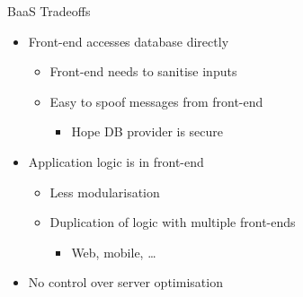 \documentclass{slide}
\begin{document}
\begin{frame}{BaaS Tradeoffs}
\vspace{1pt}
{\huge
\begin{itemize}
     \item<1-> Front-end accesses database directly
     \vspace{-4pt}
    \begin{itemize}
        \LARGE\item Front-end needs to sanitise inputs
        \vspace{3pt}
        \LARGE\item Easy to spoof messages from front-end
        \begin{itemize}
            \Large\item Hope DB provider is secure
        \end{itemize}
    \end{itemize}
    \vspace{1mm}
    \item<2-> Application logic is in front-end
    \vspace{-4pt}
    \begin{itemize}
        \LARGE\item Less modularisation
        \vspace{6pt}
        \LARGE\item Duplication of logic with multiple front-ends
        \begin{itemize}
            \Large\item Web, mobile, \dots
        \end{itemize}
    \end{itemize}
    \item<3-> No control over server optimisation
\end{itemize}
}
\end{frame}
\end{document}
